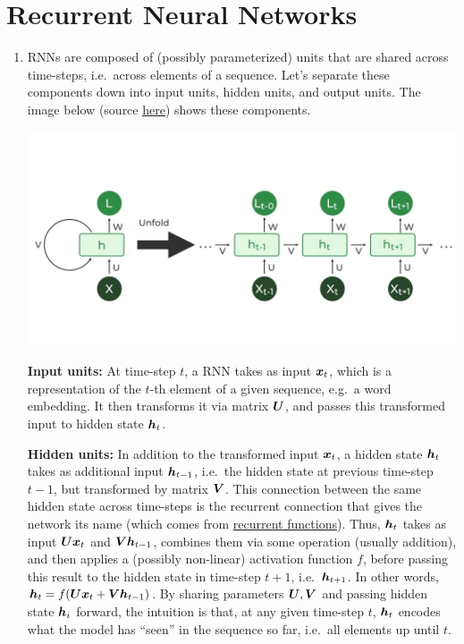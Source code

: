 \documentclass[11pt,a4paper]{article}
\begin{document}
\section{Recurrent Neural Networks}

\begin{enumerate}[label=(\alph*)]
    \item RNNs are composed of (possibly parameterized) units that are shared
          across time-steps, i.e.\ across elements of a sequence.
          Let's separate these components down into input units, hidden units,
          and output units.
          The image below (source
          \href{https://www.geeksforgeeks.org/introduction-to-recurrent-neural-network/}{\underline{here}})
          shows these components.
          \begin{center}
              \includegraphics[scale=0.4]{img/rnn_1.png}
          \end{center}
          \textbf{Input units:} At time-step $t$, a RNN takes as input ${\boldsymbol{x}}_t$,
          which is a representation of the $t$-th element of a given sequence,
          e.g.\ a word embedding.
          It then transforms it via matrix ${\boldsymbol{U}}$, and passes this transformed
          input to hidden state ${\boldsymbol{h}}_t$.

          \textbf{Hidden units:} In addition to the transformed input ${\boldsymbol{x}}_t$, a
          hidden state ${\boldsymbol{h}}_t$ takes as additional input ${\boldsymbol{h}}_{t-1}$, i.e.\ the
          hidden state at previous time-step $t-1$, but transformed by matrix
          ${\boldsymbol{V}}$.
          This connection between the same hidden state across time-steps is the
          recurrent connection that gives the network its name (which comes from
          \href{https://en.wikipedia.org/wiki/Recurrence_relation}{\underline{recurrent functions}}).
          Thus, ${\boldsymbol{h}}_{t}$ takes as input ${\boldsymbol{U}}{\boldsymbol{x}}_t$ and ${\boldsymbol{V}}{\boldsymbol{h}}_{t-1}$, combines
          them via some operation (usually addition), and then applies a
          (possibly non-linear) activation function $f$, before passing this
          result to the hidden state in time-step $t+1$, i.e.\ ${\boldsymbol{h}}_{t+1}$.
          In other words, ${\boldsymbol{h}}_t = f({\boldsymbol{U}}{\boldsymbol{x}}_t + {\boldsymbol{V}}{\boldsymbol{h}}_{t-1})$.
          By sharing parameters ${\boldsymbol{U}},{\boldsymbol{V}}$ and passing hidden state ${\boldsymbol{h}}_i$
          forward, the intuition is that, at any given time-step $t$, ${\boldsymbol{h}}_{t}$
          encodes what the model has ``seen'' in the sequence so far, i.e.\ all
          elements up until $t$.


\end{enumerate}
\end{document}
